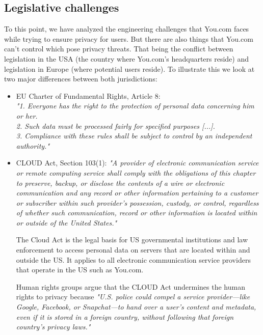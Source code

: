 \documentclass[5p,twocolumn,final]{elsarticle}
\begin{document}
\subsection{Legislative challenges}
To this point, we have analyzed the engineering challenges that You.com faces while trying to ensure privacy for users. But there are also things that You.com can't control which pose privacy threats. That being the conflict between legislation in the USA (the country where You.com's headquarters reside) and legislation in Europe (where potential users reside). To illustrate this we look at two major differences between both jurisdictions:\par
\begin{itemize}
\item{EU Charter of Fundamental Rights, Article 8:}
\textit{\\"1. Everyone has the right to the protection of personal data concerning him or her.\\
2. Such data must be processed fairly for specified purposes [...].\\
3. Compliance with these rules shall be subject to control by an independent authority."}
\item{CLOUD Act, Section 103(1):}
\textit{"A provider of electronic communication service or remote computing service shall comply with the obligations of this chapter to preserve, backup, or disclose the contents of a wire or electronic communication and any record or other information pertaining to a customer or subscriber within such provider’s possession, custody, or control, regardless of whether such communication, record or other information is located within or outside of the United States."}\par
The Cloud Act is the legal basis for US governmental institutions and law enforcement to access personal data on servers that are located within and outside the US. It applies to all electronic communication service providers that operate in the US such as You.com.\par
Human rights groups argue that the CLOUD Act undermines the human rights to privacy because \textit{"U.S. police could compel a service provider—like Google, Facebook, or Snapchat—to hand over a user’s content and metadata, even if it is stored in a foreign country, without following that foreign country’s privacy laws."}\cite{cloud-act-eff} 
\end{itemize}
\end{document}

